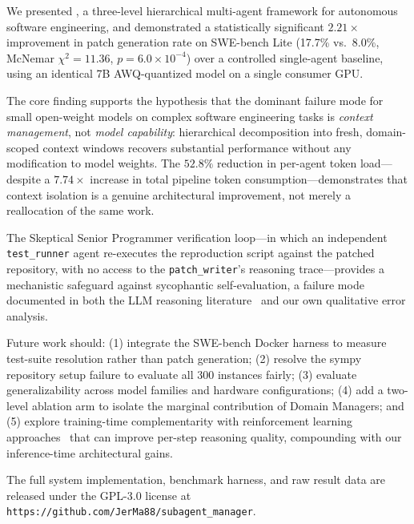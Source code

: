 
We presented \sysname, a three-level hierarchical multi-agent framework for
autonomous software engineering, and demonstrated a statistically significant
$2.21\times$ improvement in patch generation rate on SWE-bench Lite (17.7\%
vs.\ 8.0\%, McNemar $\chi^2 = 11.36$, $p = 6.0 \times 10^{-4}$) over a
controlled single-agent baseline, using an identical 7B AWQ-quantized model
on a single consumer GPU.

The core finding supports the hypothesis that the dominant failure mode for
small open-weight models on complex software engineering tasks is
\emph{context management}, not \emph{model capability}: hierarchical
decomposition into fresh, domain-scoped context windows recovers substantial
performance without any modification to model weights. The $52.8\%$
reduction in per-agent token load---despite a $7.74\times$ increase in total
pipeline token consumption---demonstrates that context isolation is a
genuine architectural improvement, not merely a reallocation of the same
work.

The Skeptical Senior Programmer verification loop---in which an independent
\texttt{test\_runner} agent re-executes the reproduction script against the
patched repository, with no access to the \texttt{patch\_writer}'s reasoning
trace---provides a mechanistic safeguard against sycophantic self-evaluation,
a failure mode documented in both the LLM reasoning
literature~\cite{huang2023self} and our own qualitative error analysis.

Future work should: (1) integrate the SWE-bench Docker harness to measure
test-suite resolution rather than patch generation; (2) resolve the sympy
repository setup failure to evaluate all 300 instances fairly; (3) evaluate
generalizability across model families and hardware configurations;
(4) add a two-level ablation arm to isolate the marginal contribution of
Domain Managers; and (5) explore training-time complementarity with
reinforcement learning approaches~\cite{luo2025swerl} that can improve
per-step reasoning quality, compounding with our inference-time architectural
gains.

The full system implementation, benchmark harness, and raw result data are
released under the GPL-3.0 license at
\texttt{https://github.com/JerMa88/subagent\_manager}.
